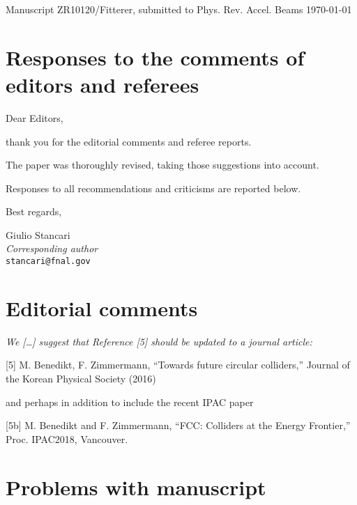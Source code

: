 \documentclass[aps
,prstab
,preprint,tightenlines
,amsfonts,amssymb,amsmath
]{revtex4-1}
\begin{document}
Manuscript ZR10120/Fitterer, submitted to Phys. Rev. Accel. Beams  \hfill \today

\section*{Responses to the comments of editors and referees}

Dear Editors,

thank you for the editorial comments and referee reports.

The paper was thoroughly revised, taking those suggestions into account.

Responses to all recommendations and criticisms are reported below.

Best regards,

Giulio Stancari\\
\emph{Corresponding author}\\
\texttt{stancari@fnal.gov}


\section*{Editorial comments}

{\em We [\ldots] suggest that Reference [5] should be updated to a journal
  article:

  [5] M. Benedikt, F. Zimmermann, ``Towards future circular
  colliders,'' Journal of the Korean Physical Society (2016)

  and perhaps in addition to include the recent IPAC paper
  
  [5b] M. Benedikt and F. Zimmermann, ``FCC: Colliders at the Energy
  Frontier,'' Proc. IPAC2018, Vancouver.
}


\section*{Problems with manuscript}
\end{document}
